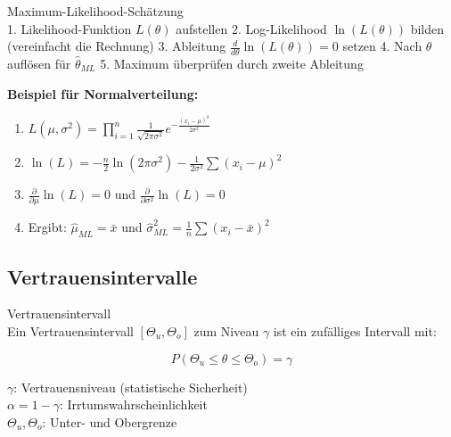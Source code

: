 \begin{KR}{Maximum-Likelihood-Schätzung}\\
1. Likelihood-Funktion $L(\theta)$ aufstellen 
2. Log-Likelihood $\ln(L(\theta))$ bilden (vereinfacht die Rechnung)
3. Ableitung $\frac{d}{d\theta}\ln(L(\theta))=0$ setzen
4. Nach $\theta$ auflösen für $\hat{\theta}_{ML}$
5. Maximum überprüfen durch zweite Ableitung

\textbf{Beispiel für Normalverteilung:}
\begin{enumerate}
  \item $L(\mu,\sigma^2) = \prod_{i=1}^n \frac{1}{\sqrt{2\pi\sigma^2}}e^{-\frac{(x_i-\mu)^2}{2\sigma^2}}$
  \item $\ln(L) = -\frac{n}{2}\ln(2\pi\sigma^2) - \frac{1}{2\sigma^2}\sum(x_i-\mu)^2$
  \item $\frac{\partial}{\partial\mu}\ln(L) = 0$ und $\frac{\partial}{\partial\sigma^2}\ln(L) = 0$
  \item Ergibt: $\hat{\mu}_{ML} = \bar{x}$ und $\hat{\sigma}^2_{ML} = \frac{1}{n}\sum(x_i-\bar{x})^2$
\end{enumerate}
\end{KR}

\subsection{Vertrauensintervalle}

\begin{definition}{Vertrauensintervall}\\
Ein Vertrauensintervall $[\Theta_u,\Theta_o]$ zum Niveau $\gamma$ ist ein zufälliges Intervall mit:

\[P(\Theta_u \leq \theta \leq \Theta_o) = \gamma\]

$\gamma$: Vertrauensniveau (statistische Sicherheit)\\
$\alpha = 1-\gamma$: Irrtumswahrscheinlichkeit\\
$\Theta_u, \Theta_o$: Unter- und Obergrenze
\end{definition}

